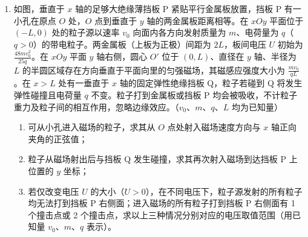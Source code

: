\documentclass[\gkver]{gaokaozhenti}
\begin{document}
\begin{enumerate}
{所以 AB 段动量的变化量为 $\Delta p=mv-0=720\Ukgms$。

（3）乙从 A 滑到 B 的过程根据运动学公式有 $L=v_{0}t'+\frac{1}{2}at'^{2}$，

代入数据解得 $t'=4\Us$。

甲在地面上做匀减速运动，根据牛顿第二定律有 $\mu_{2}mg=ma_{2}$，

可得 $a_{2}=1\Umsq$。

甲到达 B 点的速度为 $v=12\Ums$，在 $4\Us$ 内甲没有停止；

在 $t'=4\Us$ 内，甲运动的距离 $x=vt'-\frac{1}{2}a_{2}t'^{2}$，

代入数据解得 $x=40\Um$，即甲乙之间的距离为 $40\Um$。
}

\item
如图，垂直于 $x$ 轴的足够大绝缘薄挡板 P 紧贴平行金属板放置，挡板 P 有一小孔在原点 $O$ 处，$O$ 点到垂直于 $y$ 轴的两金属板距离相等。在 $xOy$ 平面位于 $(-L,0)$ 处的粒子源以速率 $v_{0}$ 向面内各方向发射质量为 $m$、电荷量为 $q$（$q>0$）的带电粒子。两金属板（上板为正极）间距为 $2L$，板间电压 $U$ 初始为 $\frac{48mv_{0}^{2}}{25q}$。在 $xOy$ 平面 $y$ 轴右侧，圆心 $O'$ 位于 $(0,L)$、直径在 $y$ 轴、半径为 $L$ 的半圆区域存在方向垂直于平面向里的匀强磁场，其磁感应强度大小为 $\frac{mv_{0}}{qL}$。在 $x>L$ 处有一垂直于 $x$ 轴的固定弹性绝缘挡板 Q，粒子若碰到 Q 将发生弹性碰撞且电荷量 $q$ 不变。粒子打到金属板或挡板 P 均会被吸收，不计粒子重力及粒子间的相互作用，忽略边缘效应。（$v_{0}$、$m$、$q$、$L$ 均为已知量）
\begin{enumerate}
	\item
	可从小孔进入磁场的粒子，求其从 $O$ 点处射入磁场速度方向与 $x$ 轴正向夹角的正弦值；
	\item
	粒子从磁场射出后与挡板 Q 发生碰撞，求其再次射入磁场到达挡板 P 上位置的 $y$ 坐标；
	\item
	若仅改变电压 $U$ 的大小（$U>0$），在不同电压下，粒子源发射的所有粒子均无法打到挡板 P 右侧面；进入磁场的所有粒子打到挡板 P 右侧面有 1 个撞击点或 2 个撞击点，求以上三种情况分别对应的电压取值范围（用已知量 $v_{0}$、$m$、$q$ 表示）。
\end{enumerate}
\onepicture[h=7.5cm, align=right]{}

\end{enumerate}
\end{document}

